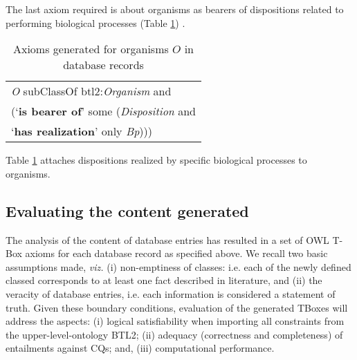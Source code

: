 The last axiom required is about organisms as bearers of dispositions related to performing biological processes (Table \ref{table:Organism}) .

\begin{table}[H]
	\caption{Axioms generated for organisms  $O$ in database records}
	\label{table:Organism}
	\centering
	\begin{tabular}{p{3in}}
		\hline
			\textit{O} subClassOf btl2:\textit{Organism} and \\
			\hspace{0.5cm} (`\textbf{is bearer of}'  some (\textit{Disposition} and \\
			\hspace{1cm} `\textbf{has realization}' only \textit{Bp}))) \\
		\hline
	\end{tabular}
\end{table}%
\noindent
Table \ref{table:Organism} attaches dispositions realized by specific biological processes to organisms. 

\subsection{Evaluating the content generated}
\label{sec:evaluation}
The analysis of the content of database entries has resulted in a set of OWL T-Box axioms for each database record as specified above. We recall two basic assumptions made, \textit{viz.} (i) non-emptiness of classes: i.e. each of the newly defined classed corresponds to at least one fact described in literature, and (ii) the veracity of database entries, i.e. each information is considered a statement of truth. Given these boundary conditions, evaluation of the generated TBoxes will address the aspects: (i) logical satisfiability when importing all constraints from the upper-level-ontology BTL2; (ii) adequacy (correctness and completeness) of entailments against CQs; and, (iii) computational performance.

%

